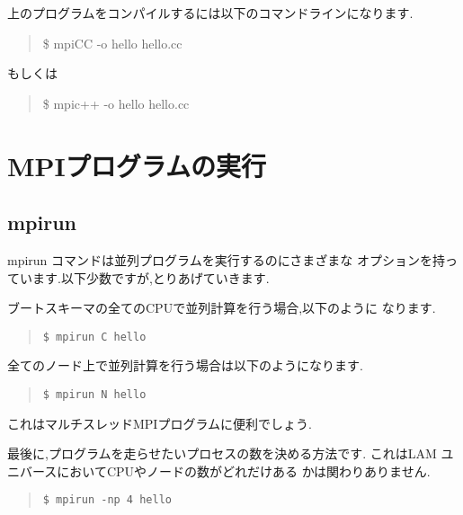 \documentclass[a4paper,titlepage]{jreport}
\begin{document}
上のプログラムをコンパイルするには以下のコマンドラインになります.

\begin{quote}
\begin{screen}
\$ mpiCC -o hello hello.cc
\end{screen}
\end{quote}

もしくは

\begin{quote}
\begin{screen}
\$ mpic++ -o hello hello.cc
\end{screen}
\end{quote}

\newpage

\section{MPIプログラムの実行}

\subsection{mpirun}
mpirun コマンドは並列プログラムを実行するのにさまざまな
オプションを持っています.以下少数ですが,とりあげていきます.

ブートスキーマの全てのCPUで並列計算を行う場合,以下のように
なります.

\begin{quote}
\begin{screen}
\begin{verbatim}
$ mpirun C hello
\end{verbatim}
\end{screen}
\end{quote}

全てのノード上で並列計算を行う場合は以下のようになります.

\begin{quote}
\begin{screen}
\begin{verbatim}
$ mpirun N hello
\end{verbatim}
\end{screen}
\end{quote}
これはマルチスレッドMPIプログラムに便利でしょう.

最後に,プログラムを走らせたいプロセスの数を決める方法です.
これはLAM ユニバースにおいてCPUやノードの数がどれだけある
かは関わりありません.

\begin{quote}
\begin{screen}
\begin{verbatim}
$ mpirun -np 4 hello
\end{verbatim}
\end{screen}
\end{quote}
\end{document}
